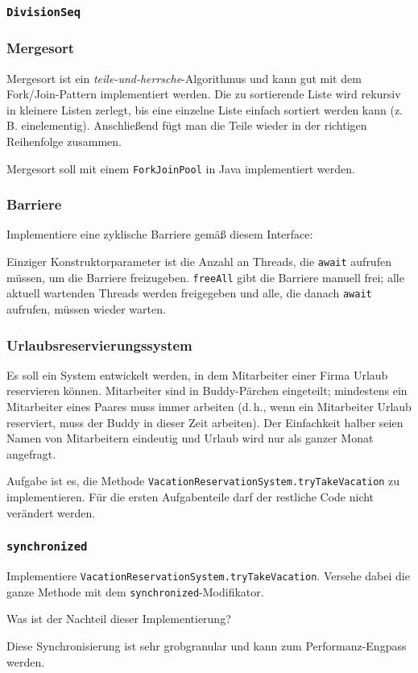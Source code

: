 \documentclass{beamer}
\begin{document}
\begin{frame}[fragile]
  \frametitle{\lstinline{DivisionSeq}}
  
\end{frame}

\begin{frame}
  \frametitle{Mergesort}
  Mergesort ist ein \emph{teile-und-herrsche}-Algorithmus und kann gut mit dem Fork/Join-Pattern implementiert werden.
  Die zu sortierende Liste wird rekursiv in kleinere Listen zerlegt,
  bis eine einzelne Liste einfach sortiert werden kann (z.\,B. einelementig).
  Anschließend fügt man die Teile wieder in der richtigen Reihenfolge zusammen.
  
  Mergesort soll mit einem \lstinline{ForkJoinPool} in Java implementiert werden.
\end{frame}

\begin{frame}
  \frametitle{Barriere}
  Implementiere eine zyklische Barriere gemäß diesem Interface:
  
  Einziger Konstruktorparameter ist die Anzahl an Threads,
  die \lstinline{await} aufrufen müssen,
  um die Barriere freizugeben.
  \lstinline{freeAll} gibt die Barriere manuell frei;
  alle aktuell wartenden Threads werden freigegeben
  und alle, die danach \lstinline{await} aufrufen,
  müssen wieder warten.
\end{frame}

\begin{frame}
  \frametitle{Urlaubsreservierungssystem}
  Es soll ein System entwickelt werden,
  in dem Mitarbeiter einer Firma Urlaub reservieren können.
  Mitarbeiter sind in Buddy-Pärchen eingeteilt;
  mindestens ein Mitarbeiter eines Paares muss immer arbeiten
  (d.\,h., wenn ein Mitarbeiter Urlaub reserviert,
  muss der Buddy in dieser Zeit arbeiten).
  Der Einfachkeit halber seien Namen von Mitarbeitern eindeutig und Urlaub wird nur als ganzer Monat angefragt.
  
  Aufgabe ist es, die Methode \lstinline{VacationReservationSystem.tryTakeVacation} zu implementieren.
  Für die ersten Aufgabenteile darf der restliche Code nicht verändert werden.
\end{frame}

\begin{frame}
  \frametitle{\lstinline{synchronized}}
  Implementiere \lstinline{VacationReservationSystem.tryTakeVacation}.
  Versehe dabei die ganze Methode mit dem \lstinline{synchronized}-Modifikator.

  Was ist der Nachteil dieser Implementierung?
  
  \pause
  Diese Synchronisierung ist sehr grobgranular und kann zum Performanz-Engpass werden.
\end{frame}
\end{document}
